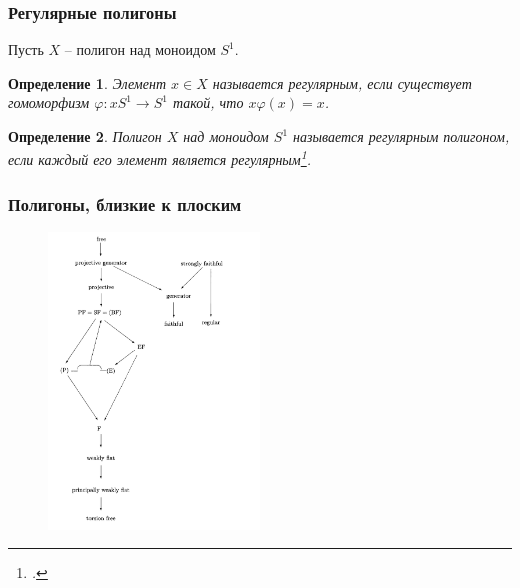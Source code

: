\documentclass[11pt, notheorems]{beamer}
\newtheorem{definition}{Определение}
\begin{document}
\begin{frame}
	\frametitle{Регулярные полигоны}

	Пусть $X$ -- полигон над моноидом $S^1$.

	\begin{definition}
		Элемент $x \in X$ называется \textit{регулярным}, если существует гомоморфизм $\varphi: xS^1 \rightarrow S^1$ такой, что $x \varphi(x) = x$.
	\end{definition}

	\begin{definition}
		Полигон $X$ над моноидом $S^1$ называется \textit{регулярным} полигоном, если каждый его элемент является регулярным\footcite[определение III.19.1]{kilp}.
	\end{definition}
\end{frame}

\begin{frame}
	\frametitle{Полигоны, близкие к плоским}

	\begin{figure}
		\center
		\includegraphics[width=0.5\textwidth]{overview_1.png}
	\end{figure}
\end{frame}
\end{document}
